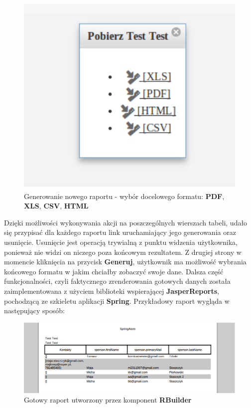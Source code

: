 	\begin{figure}
		\centering
		\includegraphics[width=1.0\textwidth]{images/rbuilder_generateReport}
		\caption[Generowanie nowego raportu - wybór docelowego formatu]{
			Generowanie nowego raportu - wybór docelowego formatu: \textbf{PDF}, \textbf{XLS}, \textbf{CSV}, \textbf{HTML}
		}
		\vspace{-10pt}
		\label{app:wizard_newReport_generateReport}
	\end{figure}
	
	Dzięki możliwości wykonywania akcji na poszczególnych wierszach tabeli, udało się przypisać dla każdego raportu link uruchamiający jego
	generowania oraz usunięcie. Usunięcie jest operacją trywialną z punktu widzenia użytkownika, ponieważ nie widzi on niczego poza 
	końcowym rezultatem. Z drugiej strony w momencie kliknięcia na przycisk \textbf{Generuj}, użytkownik ma możliwość
	wybrania końcowego formatu w jakim chciałby zobaczyć swoje dane. 
	Dalsza część funkcjonalności, czyli faktycznego zrenderowania gotowych danych została zaimplementowana z użyciem biblioteki wspierającej
	\textbf{JasperReports}, pochodzącą ze szkieletu aplikacji \textbf{Spring}. Przykładowy raport wygląda w następujący sposób:
	\begin{figure}[H]
		\centering
		\includegraphics[width=1.0\textwidth]{images/rbuilder_report}
		\caption[Gotowy raport utworzony przez komponent \textbf{RBuilder}]{
			Gotowy raport utworzony przez komponent \textbf{RBuilder}
		}
		\label{app:wizard_newReport_report}
	\end{figure}		

